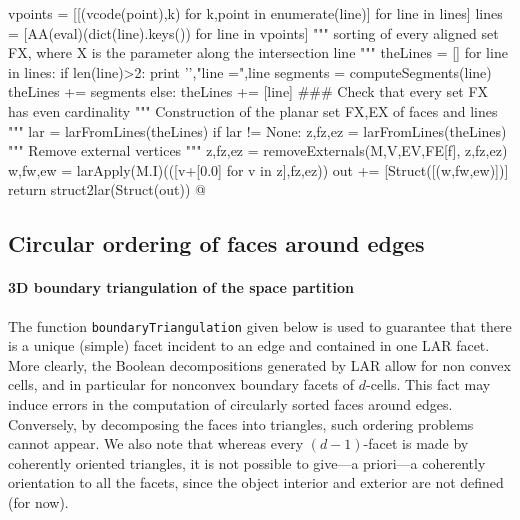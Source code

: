 \documentclass[11pt,oneside]{article}    %
\begin{document}
{        vpoints = [[(vcode(point),k) for k,point in enumerate(line)] for line in lines]
        lines = [AA(eval)(dict(line).keys()) for line in vpoints]
        """ sorting of every aligned set FX, where X is the parameter along the intersection line """
        theLines = []
        for line in lines:
            if len(line)>2: 
                print '\a',"line =",line
                segments = computeSegments(line)
                theLines += segments
            else: theLines += [line]
        ### Check that every set FX has even cardinality
        """ Construction of the planar set FX,EX of faces and lines """
        lar = larFromLines(theLines)
        if lar != None: 
            z,fz,ez = larFromLines(theLines)
            """ Remove external vertices """
            z,fz,ez = removeExternals(M,V,EV,FE[f], z,fz,ez)
            w,fw,ew = larApply(M.I)(([v+[0.0] for v in z],fz,ez))
            out += [Struct([(w,fw,ew)])]
    return struct2lar(Struct(out))
@}


\subsection{Circular ordering of faces around edges}



\paragraph{3D boundary triangulation of the space partition}
The function \texttt{boundaryTriangu\-la\-tion} given below is used to guarantee that there is a unique (simple) facet incident to an edge and contained in one LAR facet. More clearly, the Boolean decompositions generated by LAR allow for non convex cells, and in particular for nonconvex boundary facets of $d$-cells. This fact may induce errors in the computation of circularly sorted faces around edges. Conversely, by decomposing the faces into triangles, such ordering problems cannot appear.  
We also note that whereas every $(d-1)$-facet is made by coherently oriented triangles, it is not possible to give---a priori---a coherently orientation to all the facets, since the object interior and exterior are not defined (for now).
\end{document}
